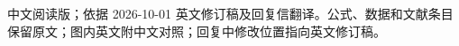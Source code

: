 \documentclass[a4paper,11pt,fontset=none]{ctexart}
\begin{document}
\begin{center}\small 中文阅读版；依据 2026-10-01 英文修订稿及回复信翻译。公式、数据和文献条目保留原文；图内英文附中文对照；回复中修改位置指向英文修订稿。\end{center}

\clearpage
{}

\end{document}

